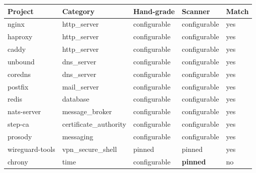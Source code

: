 \begin{longtable}[]{@{}
  >{\raggedright\arraybackslash}p{}
  >{\raggedright\arraybackslash}p{}
  >{\raggedright\arraybackslash}p{}
  >{\raggedright\arraybackslash}p{}
  >{\raggedright\arraybackslash}p{}@{}}
\toprule\noalign{}
\begin{minipage}[b]{\linewidth}\raggedright
Project
\end{minipage} & \begin{minipage}[b]{\linewidth}\raggedright
Category
\end{minipage} & \begin{minipage}[b]{\linewidth}\raggedright
Hand-grade
\end{minipage} & \begin{minipage}[b]{\linewidth}\raggedright
Scanner
\end{minipage} & \begin{minipage}[b]{\linewidth}\raggedright
Match
\end{minipage} \\
\midrule\noalign{}
\endhead
\bottomrule\noalign{}
\endlastfoot
nginx & http\_server & configurable & configurable & yes \\
haproxy & http\_server & configurable & configurable & yes \\
caddy & http\_server & configurable & configurable & yes \\
unbound & dns\_server & configurable & configurable & yes \\
coredns & dns\_server & configurable & configurable & yes \\
postfix & mail\_server & configurable & configurable & yes \\
redis & database & configurable & configurable & yes \\
nats-server & message\_broker & configurable & configurable & yes \\
step-ca & certificate\_authority & configurable & configurable & yes \\
prosody & messaging & configurable & configurable & yes \\
wireguard-tools & vpn\_secure\_shell & pinned & pinned & yes \\
chrony & time & configurable & \textbf{pinned} & no \\
\end{longtable}

